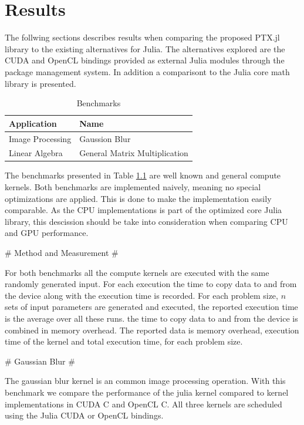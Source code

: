 \chapter{Results}
\label{chap:res}

\begin{markdown}

The follwing sections describes results when comparing the proposed
PTX.jl library to the existing alternatives for Julia. The
alternatives explored are the CUDA and OpenCL bindings provided as
external Julia modules through the package management system. In
addition a comparisont to the Julia core math library is presented.


\begin{table}[H]
  \centering
  \begin{tabular}{|l|l|}
    \hline
    Application & Name \\
    \hline
    Image Processing & Gaussion Blur \\
    \hline
    Linear Algebra & General Matrix Multiplication \\
    \hline
  \end{tabular}
  \caption{Benchmarks}
  \label{res:benchmarks}
\end{table}

The benchmarks presented in Table \ref{res:benchmarks} are well known
and general compute kernels. Both benchmarks are implemented naively,
meaning no special optimizations are applied. This is done to make the
implementation easily comparable. As the CPU implementations is part
of the optimized core Julia library, this descission should be take
into consideration when comparing CPU and GPU performance.

# Method and Measurement #
\label{sec:res:measure}

For both benchmarks all the compute kernels are executed with the same
randomly generated input. For each execution the time to copy data to
and from the device along with the execution time is recorded.  For
each problem size, $n$ sets of input parameters are generated and
executed, the reported execution time is the average over all these
runs. the time to copy data to and from the device is combined in
memory overhead. The reported data is memory overhead, execution time
of the kernel and total execution time, for each problem size.


# Gaussian Blur #

The gaussian blur kernel is an common image processing operation. With
this benchmark we compare the performance of the julia kernel compared
to kernel implementations in CUDA C and OpenCL C. All three kernels are
scheduled using the Julia CUDA or OpenCL bindings. 


\end{markdown}
